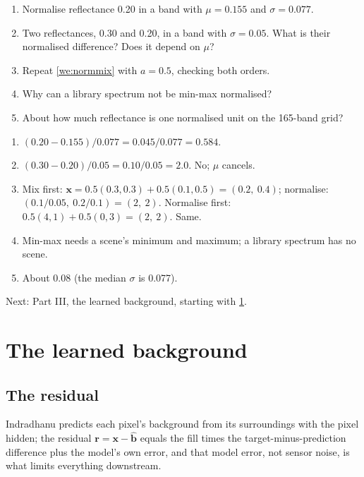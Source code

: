 \documentclass[11pt,a4paper,oneside,openany]{book}
\newcommand{\B}[1]{{\symbf{#1}}}
\newcommand{\B}[1]{{\bm{#1}}}
\newcommand{\vx}{\B{x}}
\newcommand{\vbh}{\hat{\B{b}}}
\newcommand{\vr}{\B{r}}
\newcommand{\nextchapter}[1]{\par\medskip\noindent\hfill\textsf{\small Next: #1}\par}
\begin{document}
\begin{checkyourself}
\begin{enumerate}
\item Normalise reflectance 0.20 in a band with $\mu=0.155$ and $\sigma=0.077$.
\item Two reflectances, 0.30 and 0.20, in a band with $\sigma=0.05$. What is their normalised difference? Does it depend on $\mu$?
\item Repeat \cref{we:normmix} with $a=0.5$, checking both orders.
\item Why can a library spectrum not be min-max normalised?
\item About how much reflectance is one normalised unit on the 165-band grid?
\end{enumerate}
\end{checkyourself}

\begin{answers}
\begin{enumerate}
\item $(0.20-0.155)/0.077=0.045/0.077=0.584$.
\item $(0.30-0.20)/0.05=0.10/0.05=2.0$. No; $\mu$ cancels.
\item Mix first: $\vx=0.5(0.3,0.3)+0.5(0.1,0.5)=(0.2,\ 0.4)$; normalise: $(0.1/0.05,\ 0.2/0.1)=(2,\ 2)$. Normalise first:
  $0.5(4,1)+0.5(0,3)=(2,\ 2)$. Same.
\item Min-max needs a scene's minimum and maximum; a library spectrum has no scene.
\item About 0.08 (the median $\sigma$ is 0.077).
\end{enumerate}
\end{answers}

\nextchapter{Part III, the learned background, starting with \cref{ch:residual}.}
\part{The learned background}
\label{part:learned}

\chapter{The residual}
\label{ch:residual}

\begin{onething}
Indradhanu predicts each pixel's background from its surroundings with the pixel hidden; the residual $\vr=\vx-\vbh$ equals the fill
times the target-minus-prediction difference plus the model's own error, and that model error, not sensor noise, is what limits
everything downstream.
\end{onething}
\end{document}
